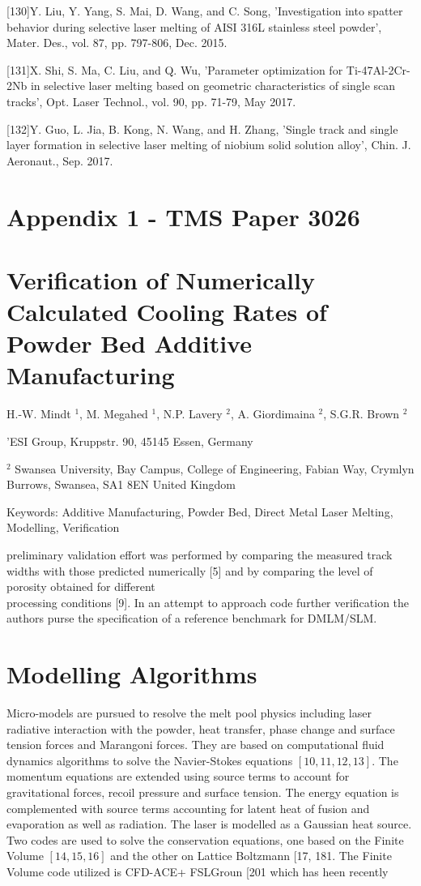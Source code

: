 \documentclass[10pt]{article}
\begin{document}
[130]Y. Liu, Y. Yang, S. Mai, D. Wang, and C. Song, 'Investigation into spatter behavior during selective laser melting of AISI 316L stainless steel powder', Mater. Des., vol. 87, pp. 797-806, Dec. 2015.

[131]X. Shi, S. Ma, C. Liu, and Q. Wu, 'Parameter optimization for Ti-47Al-2Cr-2Nb in selective laser melting based on geometric characteristics of single scan tracks', Opt. Laser Technol., vol. 90, pp. 71-79, May 2017.

[132]Y. Guo, L. Jia, B. Kong, N. Wang, and H. Zhang, 'Single track and single layer formation in selective laser melting of niobium solid solution alloy', Chin. J. Aeronaut., Sep. 2017.

\section*{Appendix 1 - TMS Paper 3026}
\section*{Verification of Numerically Calculated Cooling Rates of Powder Bed Additive Manufacturing}
H.-W. Mindt ${ }^{1}$, M. Megahed ${ }^{1}$, N.P. Lavery ${ }^{2}$, A. Giordimaina ${ }^{2}$, S.G.R. Brown ${ }^{2}$

'ESI Group, Kruppstr. 90, 45145 Essen, Germany

${ }^{2}$ Swansea University, Bay Campus, College of Engineering, Fabian Way, Crymlyn Burrows, Swansea, SA1 8EN United Kingdom

Keywords: Additive Manufacturing, Powder Bed, Direct Metal Laser Melting, Modelling, Verification

preliminary validation effort was performed by comparing the measured track widths with those predicted numerically [5] and by comparing the level of porosity obtained for different\\
processing conditions [9]. In an attempt to approach code further verification the authors purse the specification of a reference benchmark for DMLM/SLM.

\section*{Modelling Algorithms}
Micro-models are pursued to resolve the melt pool physics including laser radiative interaction with the powder, heat transfer, phase change and surface tension forces and Marangoni forces. They are based on computational fluid dynamics algorithms to solve the Navier-Stokes equations $[10,11,12,13]$. The momentum equations are extended using source terms to account for gravitational forces, recoil pressure and surface tension. The energy equation is complemented with source terms accounting for latent heat of fusion and evaporation as well as radiation. The laser is modelled as a Gaussian heat source. Two codes are used to solve the conservation equations, one based on the Finite Volume $[14,15,16]$ and the other on Lattice Boltzmann [17, 181. The Finite Volume code utilized is CFD-ACE+ FSLGroun [201 which has heen recently
\end{document}
